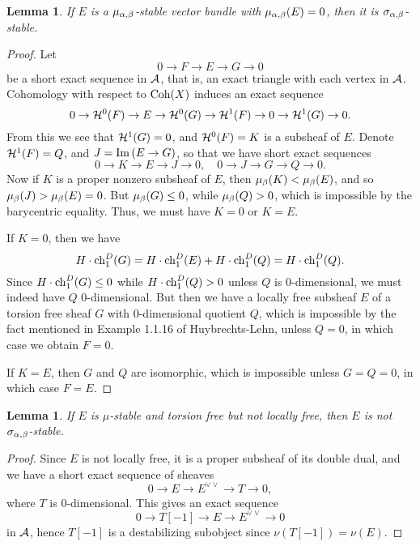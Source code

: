 \documentclass[letterpaper,10pt]{article}
\newtheorem{lem}[thm]{Lemma}
\begin{document}
\begin{lem}
    If $E$ is a $\mu_{\alpha,\beta}$-stable vector bundle with $\mu_{\alpha, \beta}(E) = 0$, then it is $\sigma_{\alpha, \beta}$-stable.
\end{lem}
\begin{proof}
    Let 
    \[ 0 \to F \to E \to G \to 0 \]
    be a short exact sequence in $\mathcal{A}$, that is, an exact triangle with each vertex in $\mathcal{A}$. Cohomology with respect to $\mathrm{Coh}(X)$ induces an exact sequence
    \[ 0 \to \mathcal{H}^0(F) \to E \to \mathcal{H}^0(G) \to \mathcal{H}^1(F) \to 0 \to \mathcal{H}^1(G) \to 0. \]
    From this we see that $\mathcal{H}^1(G) = 0$, and $\mathcal{H}^0(F) = K$ is a subsheaf of $E$. Denote $\mathcal{H}^1(F) = Q$, and $J = \mathrm{Im}\,(E \to G)$, so that we have short exact sequences
    \[ 0 \to K \to E \to J \to 0, \quad 0 \to J \to G \to Q \to 0. \]
    Now if $K$ is a proper nonzero subsheaf of $E$, then $\mu_\beta(K) < \mu_\beta(E)$, and so $\mu_\beta(J) > \mu_\beta(E) = 0$. But $\mu_\beta(G) \le 0$, while $\mu_\beta(Q) > 0$, which is impossible by the barycentric equality. Thus, we must have $K = 0$ or $K = E$.
    
    If $K = 0$, then we have 
    \[ H \cdot \operatorname{\mathrm{ch}}_1^D(G) = H \cdot \operatorname{\mathrm{ch}}_1^D(E) + H \cdot \operatorname{\mathrm{ch}}_1^D(Q) = H \cdot \operatorname{\mathrm{ch}}_1^D(Q). \]
    Since $H \cdot \operatorname{\mathrm{ch}}_1^D(G) \le 0$ while $H \cdot \operatorname{\mathrm{ch}}_1^D(Q) > 0$ unless $Q$ is 0-dimensional, we must indeed have $Q$ 0-dimensional. But then we have a locally free subsheaf $E$ of a torsion free sheaf $G$ with 0-dimensional quotient $Q$, which is impossible by the fact mentioned in Example 1.1.16 of Huybrechts-Lehn, unless $Q = 0$, in which case we obtain $F = 0$.
    
    If $K = E$, then $G$ and $Q$ are isomorphic, which is impossible unless $G = Q = 0$, in which case $F = E$.
\end{proof}

\begin{lem}
    If $E$ is $\mu$-stable and torsion free but not locally free, then $E$ is not $\sigma_{\alpha,\beta}$-stable.
\end{lem}
\begin{proof}
    Since $E$ is not locally free, it is a proper subsheaf of its double dual, and we have a short exact sequence of sheaves
    \[ 0 \to E \to E^{\vee \vee} \to T \to 0, \]
    where $T$ is 0-dimensional. This gives an exact sequence
    \[ 0 \to T[-1] \to E \to E^{\vee \vee} \to 0 \]
    in $\mathcal{A}$, hence $T[-1]$ is a destabilizing subobject since $\nu(T[-1]) = \nu(E)$.
\end{proof}
\end{document}
